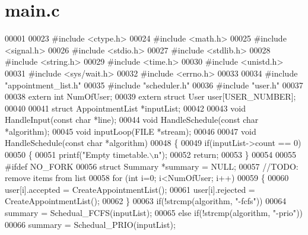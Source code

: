 \section{main.\+c}
\label{main_8c_source}

\begin{DoxyCode}
00001 
00023 \textcolor{preprocessor}{#include <ctype.h>}
00024 \textcolor{preprocessor}{#include <math.h>}
00025 \textcolor{preprocessor}{#include <signal.h>}
00026 \textcolor{preprocessor}{#include <stdio.h>}
00027 \textcolor{preprocessor}{#include <stdlib.h>}
00028 \textcolor{preprocessor}{#include <string.h>}
00029 \textcolor{preprocessor}{#include <time.h>}
00030 \textcolor{preprocessor}{#include <unistd.h>}
00031 \textcolor{preprocessor}{#include <sys/wait.h>}
00032 \textcolor{preprocessor}{#include <errno.h>}
00033 
00034 \textcolor{preprocessor}{#include "appointment_list.h"}
00035 \textcolor{preprocessor}{#include "scheduler.h"}
00036 \textcolor{preprocessor}{#include "user.h"}
00037 
00038 \textcolor{keyword}{extern} \textcolor{keywordtype}{int} NumOfUser;
00039 \textcolor{keyword}{extern} \textcolor{keyword}{struct }User user[USER_NUMBER];
00040 
00041 \textcolor{keyword}{struct }AppointmentList *inputList;
00042 
00043 \textcolor{keywordtype}{void} HandleInput(\textcolor{keyword}{const} \textcolor{keywordtype}{char} *line);
00044 \textcolor{keywordtype}{void} HandleSchedule(\textcolor{keyword}{const} \textcolor{keywordtype}{char} *algorithm);
00045 \textcolor{keywordtype}{void} inputLoop(FILE *stream);
00046 
00047 \textcolor{keywordtype}{void} HandleSchedule(\textcolor{keyword}{const} \textcolor{keywordtype}{char} *algorithm)
00048 \{
00049     \textcolor{keywordflow}{if}(inputList->count == 0)
00050     \{
00051         printf(\textcolor{stringliteral}{"Empty timetable.\(\backslash\)n"});
00052         \textcolor{keywordflow}{return};
00053     \}
00054 
00055 \textcolor{preprocessor}{#ifdef NO\_FORK}
00056     \textcolor{keyword}{struct }Summary *summary = NULL;
00057     \textcolor{comment}{//TODO: remove items from list}
00058     \textcolor{keywordflow}{for} (\textcolor{keywordtype}{int} i=0; i<NumOfUser; i++)
00059     \{
00060         user[i].accepted = CreateAppointmentList();
00061         user[i].rejected = CreateAppointmentList();
00062     \}
00063     \textcolor{keywordflow}{if}(!strcmp(algorithm, \textcolor{stringliteral}{"-fcfs"}))
00064         summary = Schedual_FCFS(inputList);
00065     \textcolor{keywordflow}{else} \textcolor{keywordflow}{if}(!strcmp(algorithm, \textcolor{stringliteral}{"-prio"}))
00066         summary = Schedual_PRIO(inputList);

\end{DoxyCode}
